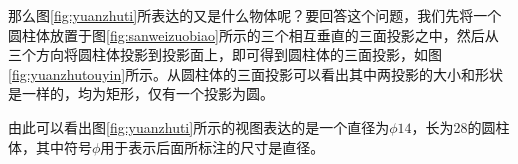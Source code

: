 那么图\ref{fig:yuanzhuti}所表达的又是什么物体呢？要回答这个问题，我们先将一个圆柱体放置于图\ref{fig:sanweizuobiao}所示的三个相互垂直的三面投影之中，然后从三个方向将圆柱体投影到投影面上，即可得到圆柱体的三面投影，如图\ref{fig:yuanzhutouyin}所示。从圆柱体的三面投影可以看出其中两投影的大小和形状是一样的，均为矩形，仅有一个投影为圆。
\begin{figure}[htbp]
\centering
{}\hspace{30pt}
\end{figure}

由此可以看出图\ref{fig:yuanzhuti}所示的视图表达的是一个直径为$\phi 14$，长为28的圆柱体，其中符号$\phi$用于表示后面所标注的尺寸是直径。

\endinput